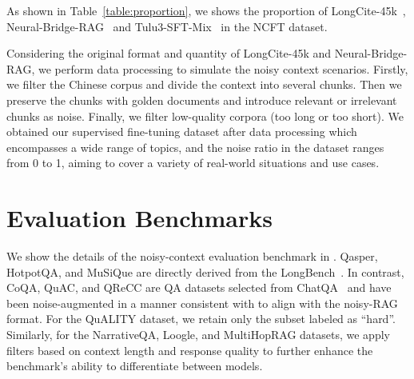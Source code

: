 As shown in Table~\ref{table:proportion}, we shows the proportion of LongCite-45k~\cite{zhang2024longcite}, Neural-Bridge-RAG~\cite{NeuralBridge2024ragdataset} and Tulu3-SFT-Mix~\cite{lambert2024tulu3} in the NCFT dataset.

Considering the original format and quantity of LongCite-45k and Neural-Bridge-RAG, we perform data processing to simulate the noisy context scenarios. 
Firstly, we filter the Chinese corpus and divide the context into several chunks.
Then we preserve the chunks with golden documents and introduce relevant or irrelevant chunks as noise.
Finally, we filter low-quality corpora (too long or too short).
We obtained our supervised fine-tuning dataset after data processing
which encompasses a wide range of topics, and the noise ratio in the dataset ranges from 0 to 1, aiming to cover a variety of real-world situations and use cases.

\section{Evaluation Benchmarks}
\label{sec:evaluation_benchmarks}

We show the details of the noisy-context evaluation benchmark in . 
Qasper, HotpotQA, and MuSiQue are directly derived from the LongBench~\cite{bai2024longbench}.
In contrast, CoQA, QuAC, and QReCC are QA datasets selected from ChatQA~\cite{liu2024chatqa} and have been noise-augmented in a manner consistent with  to align with the noisy-RAG format. 
For the QuALITY dataset, we retain only the subset labeled as ``hard''.
Similarly, for the NarrativeQA, Loogle, and MultiHopRAG datasets, we apply filters based on context length and response quality to further enhance the benchmark's ability to differentiate between models.


